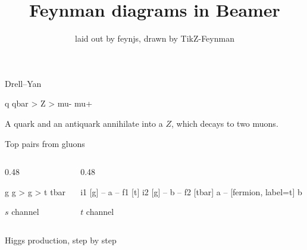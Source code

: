 \documentclass{beamer}
\title{Feynman diagrams in Beamer}
\subtitle{laid out by feynjs, drawn by TikZ-Feynman}
\date{}
\begin{document}
\begin{frame}
  \titlepage
\end{frame}

\begin{frame}[fragile]{Drell--Yan}
  \centering
  \begin{feynjs}
  q qbar > Z > mu- mu+
  \end{feynjs}

  \medskip
  A quark and an antiquark annihilate into a \(Z\), which decays to two muons.
\end{frame}

\begin{frame}[fragile]{Top pairs from gluons}
  \begin{columns}
    \begin{column}{0.48\textwidth}
      \centering
      \begin{feynjs}
      g g > g > t tbar
      \end{feynjs}

      \small \(s\) channel
    \end{column}
    \begin{column}{0.48\textwidth}
      \centering
      \begin{feynjs}
      i1 [g] -- a -- f1 [t]
      i2 [g] -- b -- f2 [tbar]
      a -- [fermion, label=t] b
      \end{feynjs}

      \small \(t\) channel
    \end{column}
  \end{columns}
\end{frame}

\begin{frame}{Higgs production, step by step}
  \centering

  \medskip
\end{frame}
\end{document}
